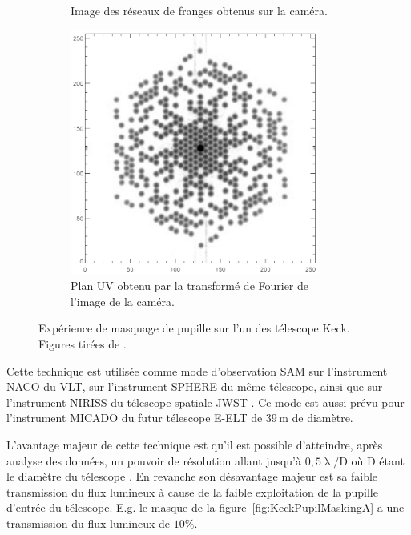 \begin{figure}[ht!]
\begin{subfigure}[t]{0.31\textwidth}
        \caption{Image des réseaux de franges obtenus sur la caméra.}
        \label{fig:KeckPupilMaskingB}
    \end{subfigure}\hspace{0.01\textwidth}
    \begin{subfigure}[t]{0.31\textwidth}
        \centering
        \includegraphics[width=0.9\textwidth]{Figure_Chap1/Tuthill2000_Figure3c.png}
        \caption{Plan UV obtenu par la transformé de Fourier de l'image de la caméra.}
        \label{fig:KeckPupilMaskingC}
    \end{subfigure}
    \caption[Expérience de masquage de pupille sur l'un des télescope Keck.]{Expérience de masquage de pupille sur l'un des télescope Keck. Figures tirées de \cite{tuthill2000}.}
    \label{fig:KeckPupilMasking}
\end{figure}

Cette technique est utilisée comme mode d'observation \ac{SAM} sur l'instrument \ac{NACO} \citep{tuthill2010, lacour2011a} du \ac{VLT}, sur l'instrument \ac{SPHERE} \citep{cheetham2016} du même télescope, ainsi que sur l'instrument \ac{NIRISS} du télescope spatiale \ac{JWST} \citep{sivaramakrishnan2012}. Ce mode est aussi prévu pour l'instrument \ac{MICADO} \citep{lacour2014} du futur télescope \ac{E-ELT} de $39 \,$m de diamètre.

L'avantage majeur de cette technique est qu'il est possible d'atteindre, après analyse des données, un pouvoir de résolution allant jusqu'à $0,5 \uplambda / \text{D}$ où D étant le diamètre du télescope \citep{lacour2011b}. En revanche son désavantage majeur est sa faible transmission du flux lumineux à cause de la faible exploitation de la pupille d'entrée du télescope. E.g. le masque de la figure~\ref{fig:KeckPupilMaskingA} a une transmission du flux lumineux de $10\%$.

